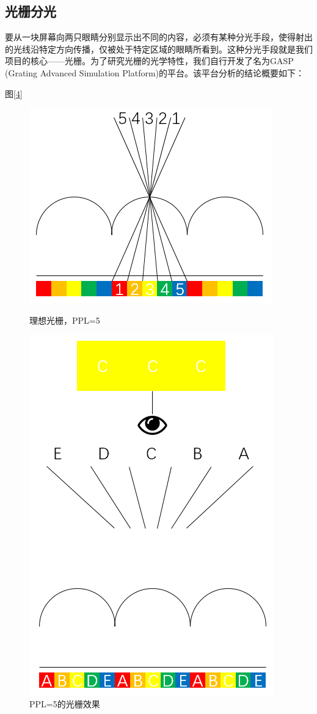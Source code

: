 \documentclass[12pt,a4paper]{article}
\begin{document}
\subsection{光栅分光}

要从一块屏幕向两只眼睛分别显示出不同的内容，必须有某种分光手段，使得射出的光线沿特定方向传播，仅被处于特定区域的眼睛所看到。这种分光手段就是我们项目的核心——光栅。为了研究光栅的光学特性，我们自行开发了名为GASP (Grating Advanced Simulation Platform)的平台。该平台分析的结论概要如下：

图\ref{4}%
\begin{figure}[htbp]
\begin{minipage}[t]{0.5\linewidth}
    \centering
    \includegraphics[width=0.8\linewidth]{4}
    \caption{理想光栅，PPL=5}
    \label{4}
\end{minipage}
\begin{minipage}[t]{0.5\linewidth}
    \centering
    \includegraphics[width=0.8\linewidth]{5}
    \caption{PPL=5的光栅效果}
    \label{5}
\end{minipage}
\end{figure}%
\end{document}
